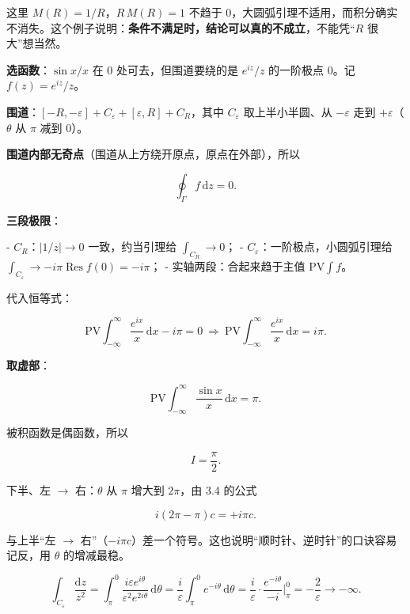 \documentclass[11pt]{ctexart}
\renewcommand{\qbreak}{\needspace{0.45\textheight}}
\begin{document}
这里 $M(R)=1/R$，$R\,M(R)=1$ 不趋于 0，大圆弧引理不适用，而积分确实不消失。这个例子说明：\textbf{条件不满足时，结论可以真的不成立}，不能凭“$R$ 很大”想当然。

\qbreak
{}

\textbf{选函数}：$\sin x/x$ 在 $0$ 处可去，但围道要绕的是 $e^{iz}/z$ 的一阶极点 $0$。记 $f(z)=e^{iz}/z$。

\textbf{围道}：$[-R,-\varepsilon]+C_\varepsilon+[\varepsilon,R]+C_R$，其中 $C_\varepsilon$ 取上半小半圆、从 $-\varepsilon$ 走到 $+\varepsilon$（$\theta$ 从 $\pi$ 减到 $0$）。

\textbf{围道内部无奇点}（围道从上方绕开原点，原点在外部），所以

$$
\oint_\Gamma f\,\mathrm{d}z=0 .
$$

\textbf{三段极限}：

- $C_R$：$\left|1/z\right|\to0$ 一致，约当引理给 $\int_{C_R}\to0$；
- $C_\varepsilon$：一阶极点，小圆弧引理给 $\int_{C_\varepsilon}\to-i\pi\operatorname{Res}f(0)=-i\pi$；
- 实轴两段：合起来趋于主值 $\mathrm{PV}\!\int f$。

代入恒等式：

$$
\mathrm{PV}\!\int_{-\infty}^{\infty}\frac{e^{ix}}{x}\,\mathrm{d}x-i\pi=0
\ \Longrightarrow\
\mathrm{PV}\!\int_{-\infty}^{\infty}\frac{e^{ix}}{x}\,\mathrm{d}x=i\pi .
$$

\textbf{取虚部}：

$$
\mathrm{PV}\!\int_{-\infty}^{\infty}\frac{\sin x}{x}\,\mathrm{d}x=\pi .
$$

被积函数是偶函数，所以

$$
I=\frac{\pi}{2} .
$$

\qbreak
{}

下半、左 $\to$ 右：$\theta$ 从 $\pi$ 增大到 $2\pi$，由 3.4 的公式

$$
i(2\pi-\pi)c=+i\pi c .
$$

与上半“左 $\to$ 右”（$-i\pi c$）差一个符号。这也说明“顺时针、逆时针”的口诀容易记反，用 $\theta$ 的增减最稳。

\qbreak
{}

$$
\int_{C_\varepsilon}\frac{\mathrm{d}z}{z^{2}}
=\int_{\pi}^{0}\frac{i\varepsilon e^{i\theta}}{\varepsilon^{2}e^{2i\theta}}\,\mathrm{d}\theta
=\frac{i}{\varepsilon}\int_{\pi}^{0}e^{-i\theta}\,\mathrm{d}\theta
=\frac{i}{\varepsilon}\cdot\frac{e^{-i\theta}}{-i}\Big|_{\pi}^{0}
=-\frac{2}{\varepsilon}\to-\infty .
$$
\end{document}
